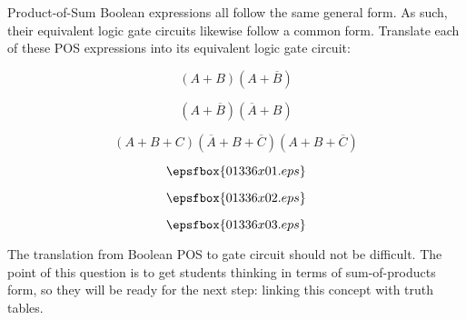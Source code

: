 

Product-of-Sum Boolean expressions all follow the same general form.  As such, their equivalent logic gate circuits likewise follow a common form.  Translate each of these POS expressions into its equivalent logic gate circuit:

\vskip 10pt

$$(A + B)(A + \overline{B})$$

\vskip 10pt

$$(A + \overline{B})(\overline{A} + B)$$

\vskip 10pt

$$(A + B + C)(\overline{A} + B + \overline{C})(A + B + \overline{C})$$

\vskip 10pt







$$\epsfbox{01336x01.eps}$$

\vskip 30pt

$$\epsfbox{01336x02.eps}$$

\vskip 30pt

$$\epsfbox{01336x03.eps}$$







The translation from Boolean POS to gate circuit should not be difficult.  The point of this question is to get students thinking in terms of sum-of-products form, so they will be ready for the next step: linking this concept with truth tables.




